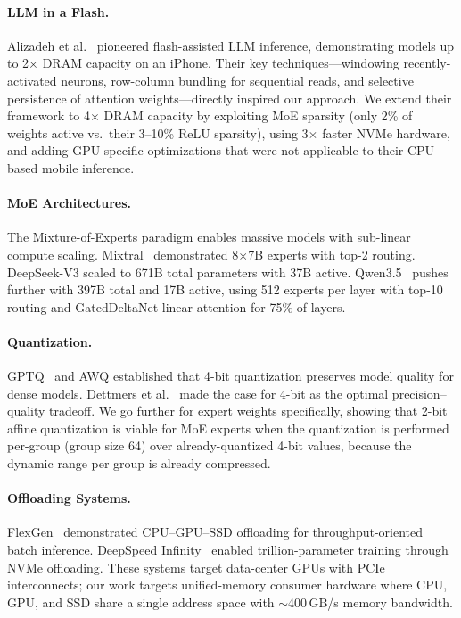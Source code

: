 \documentclass[11pt,twocolumn]{article}
\begin{document}
\paragraph{LLM in a Flash.}
Alizadeh et al.~\cite{alizadeh2023llm} pioneered flash-assisted LLM inference, demonstrating models up to 2$\times$ DRAM capacity on an iPhone.
Their key techniques---windowing recently-activated neurons, row-column bundling for sequential reads, and selective persistence of attention weights---directly inspired our approach.
We extend their framework to 4$\times$ DRAM capacity by exploiting MoE sparsity (only 2\% of weights active vs.\ their 3--10\% ReLU sparsity), using 3$\times$ faster NVMe hardware, and adding GPU-specific optimizations that were not applicable to their CPU-based mobile inference.

\paragraph{MoE Architectures.}
The Mixture-of-Experts paradigm enables massive models with sub-linear compute scaling.
Mixtral~\cite{jiang2024mixtral} demonstrated 8$\times$7B experts with top-2 routing.
DeepSeek-V3 scaled to 671B total parameters with 37B active.
Qwen3.5~\cite{yang2025qwen3} pushes further with 397B total and 17B active, using 512 experts per layer with top-10 routing and GatedDeltaNet linear attention for 75\% of layers.

\paragraph{Quantization.}
GPTQ~\cite{frantar2022gptq} and AWQ established that 4-bit quantization preserves model quality for dense models.
Dettmers et al.~\cite{dettmers2023case} made the case for 4-bit as the optimal precision--quality tradeoff.
We go further for expert weights specifically, showing that 2-bit affine quantization is viable for MoE experts when the quantization is performed per-group (group size 64) over already-quantized 4-bit values, because the dynamic range per group is already compressed.

\paragraph{Offloading Systems.}
FlexGen~\cite{sheng2023flexgen} demonstrated CPU--GPU--SSD offloading for throughput-oriented batch inference.
DeepSpeed Infinity~\cite{rajbhandari2021zero} enabled trillion-parameter training through NVMe offloading.
These systems target data-center GPUs with PCIe interconnects; our work targets unified-memory consumer hardware where CPU, GPU, and SSD share a single address space with $\sim$400\,GB/s memory bandwidth.
\end{document}
